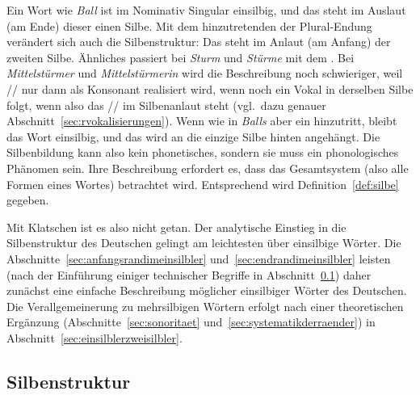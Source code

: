 Ein Wort wie \textit{Ball} ist im Nominativ Singular einsilbig, und das \textipa{[l]} steht im Auslaut (am Ende) dieser einen Silbe.
Mit dem hinzutretenden \textipa{[@]} der Plural-Endung verändert sich auch die Silbenstruktur:
Das \textipa{[l]} steht im Anlaut (am Anfang) der zweiten Silbe.
Ähnliches passiert bei \textit{Sturm} und \textit{Stürme} mit dem \textipa{[m]}.
Bei \textit{Mittelstürmer} \textipa{[mI.t@l.St\t{Y@}.m5]} und \textit{Mittelstürmerin} \textipa{[mI.t@l.St\t{Y@}.m@.KIn]} wird die Beschreibung noch schwieriger, weil // nur dann als Konsonant \textipa{[K]} realisiert wird, wenn noch ein Vokal in derselben Silbe folgt, wenn also das // im Silbenanlaut steht (vgl.\ dazu genauer Abschnitt~\ref{sec:rvokalisierungen}).
Wenn wie in \textit{Balls} aber ein \textipa{[s]} hinzutritt, bleibt das Wort einsilbig, und das \textipa{[s]} wird an die einzige Silbe hinten angehängt.
Die Silbenbildung kann also kein phonetisches, sondern sie muss ein phonologisches Phänomen sein.
Ihre Beschreibung erfordert es, dass das Gesamtsystem (also \zB alle Formen eines Wortes) betrachtet wird.
Entsprechend wird Definition~\ref{def:silbe} gegeben.


Mit Klatschen ist es also nicht getan.
Der analytische Einstieg in die Silbenstruktur des Deutschen gelingt am leichtesten über einsilbige Wörter.
Die Abschnitte~\ref{sec:anfangsrandimeinsilbler} und~\ref{sec:endrandimeinsilbler} leisten (nach der Einführung einiger technischer Begriffe in Abschnitt~\ref{sec:silbenstruktur}) daher zunächst eine einfache Beschreibung möglicher einsilbiger Wörter des Deutschen.
Die Verallgemeinerung zu mehrsilbigen Wörtern erfolgt nach einer theoretischen Ergänzung (Abschnitte~\ref{sec:sonoritaet} und~\ref{sec:systematikderraender}) in Abschnitt~\ref{sec:einsilblerzweisilbler}.


\subsection{Silbenstruktur}

\label{sec:silbenstruktur}


